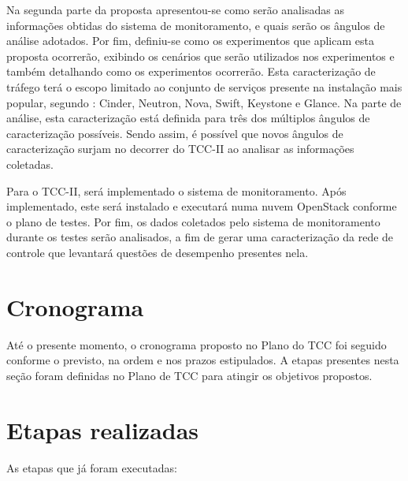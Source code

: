 Na segunda parte da proposta apresentou-se como serão analisadas as informações obtidas do sistema de monitoramento, e quais serão os ângulos de análise adotados.
%
Por fim, definiu-se como os experimentos que aplicam esta proposta ocorrerão, exibindo os cenários que serão utilizados nos experimentos e também detalhando como os experimentos ocorrerão.
%
Esta caracterização de tráfego terá o escopo limitado ao conjunto de serviços presente na instalação mais popular, segundo : Cinder, Neutron, Nova, Swift, Keystone e Glance.
%
Na parte de análise, esta caracterização está definida para três dos múltiplos ângulos de caracterização possíveis.
%
Sendo assim, é possível que novos ângulos de caracterização surjam no decorrer do TCC-II ao analisar as informações coletadas.

Para o TCC-II, será implementado o sistema de monitoramento. 
%
Após implementado, este será instalado e executará numa nuvem OpenStack conforme o plano de testes.
%
Por fim, os dados coletados pelo sistema de monitoramento durante os testes serão analisados, a fim de gerar uma caracterização da rede de controle que levantará questões de desempenho presentes nela.

\section{Cronograma}
Até o presente momento, o cronograma proposto no Plano do TCC foi seguido conforme o previsto, na ordem e nos prazos estipulados. A etapas presentes nesta seção foram definidas no Plano de TCC para atingir os objetivos propostos.

\section{Etapas realizadas}

As etapas que já foram executadas:

